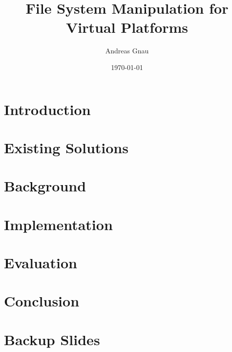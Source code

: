 \documentclass{beamer}
\title[File System Manipulation for Virtual Platforms]{File System Manipulation for Virtual Platforms}
\subtitle{}
\author{Andreas Gnau}
\date{\today}
\begin{document}
    

    \section[Outline]{}
    \section{Introduction}
        
        
    \section{Existing Solutions}
        
        
    \section{Background}
        
        
        
        
        

    \section{Implementation}
        
    \section{Evaluation}
        
        
    \section{Conclusion}
        
        
    \section*{Backup Slides}
        
        
    
%	
\end{document}
